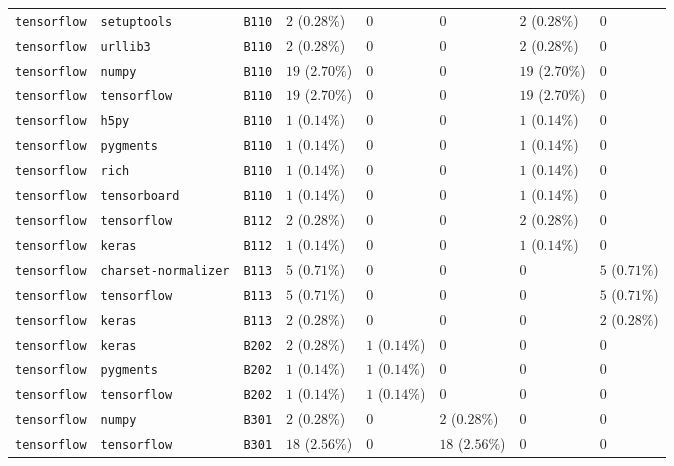 \begin{table}
\begin{tabular}{llllllll}
\texttt{tensorflow} & \texttt{setuptools} & \texttt{B110} & $2$ ($0.28\%$) & $0$ & $0$ & $2$ ($0.28\%$) & $0$ \\
\texttt{tensorflow} & \texttt{urllib3} & \texttt{B110} & $2$ ($0.28\%$) & $0$ & $0$ & $2$ ($0.28\%$) & $0$ \\
\texttt{tensorflow} & \texttt{numpy} & \texttt{B110} & $19$ ($2.70\%$) & $0$ & $0$ & $19$ ($2.70\%$) & $0$ \\
\texttt{tensorflow} & \texttt{tensorflow} & \texttt{B110} & $19$ ($2.70\%$) & $0$ & $0$ & $19$ ($2.70\%$) & $0$ \\
\texttt{tensorflow} & \texttt{h5py} & \texttt{B110} & $1$ ($0.14\%$) & $0$ & $0$ & $1$ ($0.14\%$) & $0$ \\
\texttt{tensorflow} & \texttt{pygments} & \texttt{B110} & $1$ ($0.14\%$) & $0$ & $0$ & $1$ ($0.14\%$) & $0$ \\
\texttt{tensorflow} & \texttt{rich} & \texttt{B110} & $1$ ($0.14\%$) & $0$ & $0$ & $1$ ($0.14\%$) & $0$ \\
\texttt{tensorflow} & \texttt{tensorboard} & \texttt{B110} & $1$ ($0.14\%$) & $0$ & $0$ & $1$ ($0.14\%$) & $0$ \\
\texttt{tensorflow} & \texttt{tensorflow} & \texttt{B112} & $2$ ($0.28\%$) & $0$ & $0$ & $2$ ($0.28\%$) & $0$ \\
\texttt{tensorflow} & \texttt{keras} & \texttt{B112} & $1$ ($0.14\%$) & $0$ & $0$ & $1$ ($0.14\%$) & $0$ \\
\texttt{tensorflow} & \texttt{charset-normalizer} & \texttt{B113} & $5$ ($0.71\%$) & $0$ & $0$ & $0$ & $5$ ($0.71\%$) \\
\texttt{tensorflow} & \texttt{tensorflow} & \texttt{B113} & $5$ ($0.71\%$) & $0$ & $0$ & $0$ & $5$ ($0.71\%$) \\
\texttt{tensorflow} & \texttt{keras} & \texttt{B113} & $2$ ($0.28\%$) & $0$ & $0$ & $0$ & $2$ ($0.28\%$) \\
\texttt{tensorflow} & \texttt{keras} & \texttt{B202} & $2$ ($0.28\%$) & $1$ ($0.14\%$) & $0$ & $0$ & $0$ \\
\texttt{tensorflow} & \texttt{pygments} & \texttt{B202} & $1$ ($0.14\%$) & $1$ ($0.14\%$) & $0$ & $0$ & $0$ \\
\texttt{tensorflow} & \texttt{tensorflow} & \texttt{B202} & $1$ ($0.14\%$) & $1$ ($0.14\%$) & $0$ & $0$ & $0$ \\
\texttt{tensorflow} & \texttt{numpy} & \texttt{B301} & $2$ ($0.28\%$) & $0$ & $2$ ($0.28\%$) & $0$ & $0$ \\
\texttt{tensorflow} & \texttt{tensorflow} & \texttt{B301} & $18$ ($2.56\%$) & $0$ & $18$ ($2.56\%$) & $0$ & $0$ \\

\end{tabular}
\end{table}
